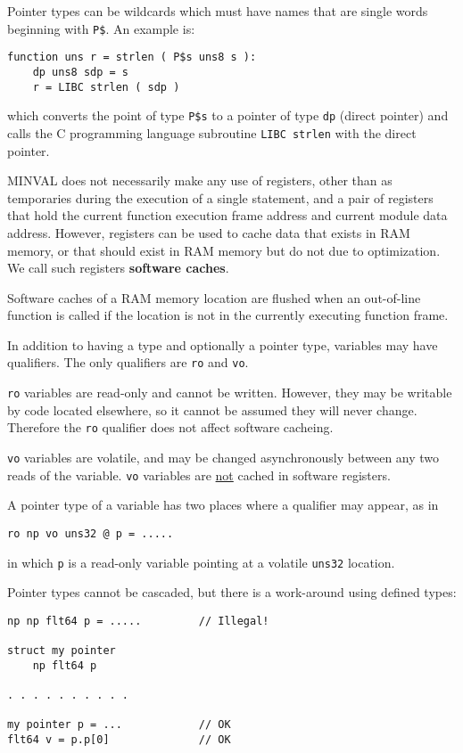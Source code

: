 \documentclass[12pt]{article}
\newcommand{\skey}[2]{{\rm \bfseries #1#2}}
\newenvironment{indpar}[1][0.3in]%
	{\begin{list}{}%
		     {\setlength{\itemsep}{0in}%
		      \setlength{\topsep}{0in}%
		      \setlength{\parsep}{1ex}%
		      \setlength{\labelwidth}{#1}%
		      \setlength{\leftmargin}{#1}%
		      \addtolength{\leftmargin}{\labelsep}}%
	 \item}%
	{\end{list}}
\begin{document}
Pointer types can be wildcards which must have names that are
single words beginning with {\tt P\$}.  An example is:

\begin{indpar}\begin{verbatim}
function uns r = strlen ( P$s uns8 s ):
    dp uns8 sdp = s
    r = LIBC strlen ( sdp )
\end{verbatim}\end{indpar}

which converts the point of type {\tt P\$s} to a pointer of
type {\tt dp} (direct pointer) and calls the C programming
language subroutine {\tt LIBC strlen} with the direct pointer.

MINVAL does not necessarily make any use of registers, other
than as temporaries during the execution of a single statement,
and a pair of registers that hold the current function
execution frame address and current module data address.
However, registers can be used to cache data that exists in
RAM memory, or that should exist in RAM memory but do not
due to optimization.  We call such registers
\skey{software cach}{es}.

Software caches of a RAM memory location are flushed when an out-of-line
function is called if the location is not in the currently
executing function frame.

In addition to having a type and optionally a pointer type,
variables may have qualifiers.  The only qualifiers are
{\tt ro} and {\tt vo}.

{\tt ro} variables are read-only and
cannot be written.  However, they may be writable by
code located elsewhere, so it cannot be assumed they will
never change.  Therefore the {\tt ro} qualifier does not
affect software cacheing.

{\tt vo} variables are volatile, and may be changed asynchronously
between any two reads of the variable.  {\tt vo} variables are
\underline{not} cached in software registers.

A pointer type of a variable
has two places where a qualifier may appear, as in

\begin{indpar}\begin{verbatim}
ro np vo uns32 @ p = .....
\end{verbatim}\end{indpar}
in which {\tt p} is a read-only variable pointing at a volatile
{\tt uns32} location.

Pointer types cannot be cascaded, but there is a work-around
using defined types:
\begin{indpar}\begin{verbatim}
np np flt64 p = .....         // Illegal!

struct my pointer
    np flt64 p

. . . . . . . . . .

my pointer p = ...            // OK
flt64 v = p.p[0]              // OK
\end{verbatim}\end{indpar}
\end{document}
